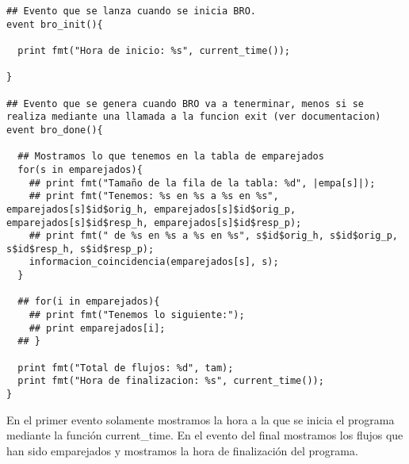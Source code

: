 \intro
\begin{lstlisting}[language=Consola]
## Evento que se lanza cuando se inicia BRO.
event bro_init(){

  print fmt("Hora de inicio: %s", current_time());

}

## Evento que se genera cuando BRO va a tenerminar, menos si se realiza mediante una llamada a la funcion exit (ver documentacion)
event bro_done(){

  ## Mostramos lo que tenemos en la tabla de emparejados
  for(s in emparejados){
    ## print fmt("Tamaño de la fila de la tabla: %d", |empa[s]|);
    ## print fmt("Tenemos: %s en %s a %s en %s", emparejados[s]$id$orig_h, emparejados[s]$id$orig_p, emparejados[s]$id$resp_h, emparejados[s]$id$resp_p);
    ## print fmt(" de %s en %s a %s en %s", s$id$orig_h, s$id$orig_p, s$id$resp_h, s$id$resp_p);
    informacion_coincidencia(emparejados[s], s);
  }

  ## for(i in emparejados){
    ## print fmt("Tenemos lo siguiente:");
    ## print emparejados[i];
  ## }

  print fmt("Total de flujos: %d", tam);
  print fmt("Hora de finalizacion: %s", current_time());
}
\end{lstlisting}
\intro
En el primer evento solamente mostramos la hora a la que se 
inicia el programa mediante la función current_time. En el 
evento del final mostramos los flujos que han sido emparejados 
y mostramos la hora de finalización del programa.

